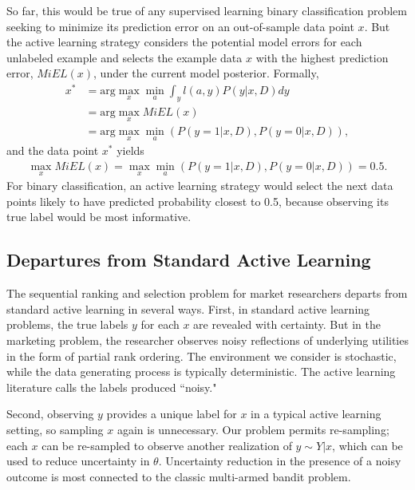 \documentclass[a4paper,11pt]{article}
\begin{document}
So far, this would be true of any supervised learning binary classification problem seeking to minimize its prediction error on an out-of-sample data point $x$. But the active learning strategy considers the potential model errors for each unlabeled example and selects the example data $x$ with the highest prediction error, $MiEL(x)$, under the current model posterior. Formally,
\begin{align}
x^{*}  &= \text{arg} \max_{x} \min_{a} \int_y l(a,y) P(y|x,D) dy \\
&= \text{arg} \max_{x} MiEL(x) \\
& =  \text{arg} \max_{x} \min_{a} \left( P(y=1|x,D), P(y=0|x,D) \right),
\end{align}
and the data point $x^{*}$ yields
\begin{align}
\max_{x} MiEL(x) = \max_{x} \min_{a} \left( P(y=1|x,D), P(y=0|x,D) \right) = 0.5 .
\end{align}
For binary classification, an active learning strategy would select the next data points likely to have predicted probability closest to 0.5, because observing its true label would be most informative.





\subsection{Departures from Standard Active Learning}

The sequential ranking and selection problem for market researchers departs from standard active learning in several ways. First, in standard active learning problems, the true labels $y$ for each $x$ are revealed with certainty. But in the marketing problem, the researcher observes noisy reflections of underlying utilities in the form of partial rank ordering. The environment we consider is stochastic, while the data generating process is typically deterministic. The active learning literature \citep{GolovinEtAl2010noisy,NatarajanEtAl2013noisy} calls the labels produced ``noisy."

Second, observing $y$ provides a unique label for $x$ in a typical active learning setting, so sampling $x$ again is unnecessary. Our problem permits re-sampling; each $x$ can be re-sampled to observe another realization of $y \sim Y|x$, which can be used to reduce uncertainty in $\theta$. Uncertainty reduction in the presence of a noisy outcome is most connected to the classic multi-armed bandit problem. 
\end{document}
